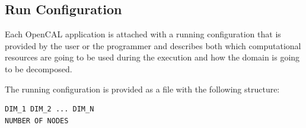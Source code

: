 \subsection{Run Configuration}
Each OpenCAL application is attached with a running configuration that is provided by the user or the programmer and describes both which computational resources are going to be used during the execution and how the domain is going to be decomposed.

The running configuration is provided as a file with the following structure:

\begin{mdframed}
\begin{mdframed}[hidealllines=true,backgroundcolor=blue!5]
	\begin{verbatim}
DIM_1 DIM_2 ... DIM_N
NUMBER OF NODES
	\end{verbatim}


\end{mdframed}
\end{mdframed}
